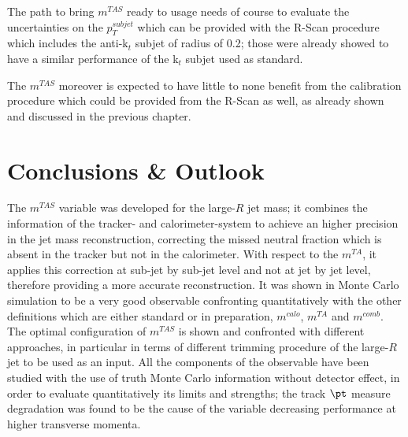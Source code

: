 \documentclass[UKenglish,texlive=2013]{\ATLASLATEXPATH atlasdoc}
\newcommand{\mta}{m^{TA}}
\newcommand{\mtas}{m^{TAS}}
\newcommand{\mcal}{m^{calo}}
\newcommand{\mcomb}{m^{comb}}
\newcommand{\iqr}{\frac{1}{2}\: \times\: 68\% \:\textrm{IQnR/median}}
\begin{document}
The path to bring $\mtas$ ready to usage needs of course to evaluate the uncertainties on the  $p_T^{subjet}$ which can be provided with the R-Scan procedure which includes the anti-k$_t$ subjet of radius of 0.2; those were already showed to have a similar performance of the k$_t$ subjet used as standard.

The $\mtas$ moreover is expected to have little to none benefit from the calibration procedure which could be provided from the R-Scan as well, as already shown and discussed in the previous chapter. 





\clearpage
\section{Conclusions \& Outlook}
\label{sec:conclusions}
The $\mtas$ variable was developed for the large-$R$ jet mass; it combines the information of the tracker- and calorimeter-system to achieve an higher precision in the jet mass reconstruction, correcting the missed neutral fraction which is absent in the tracker but not in the calorimeter.
With respect to the $\mta$, it applies this correction at sub-jet by sub-jet level and not at jet by jet level, therefore providing a more accurate reconstruction. 
It was shown in Monte Carlo simulation to be a very good observable confronting quantitatively with the other definitions which are either standard or in preparation, $\mcal$, $\mta$ and $\mcomb$.
The optimal configuration of $\mtas$ is shown and confronted with different approaches, in particular in terms of different trimming procedure of the large-$R$ jet to be used as an input.
All the components of the observable have been studied with the use of truth Monte Carlo information without detector effect, in order to evaluate quantitatively its limits and strengths; the track $\pt$ measure degradation was found to be the cause of the variable decreasing performance at higher transverse momenta.
\end{document}
